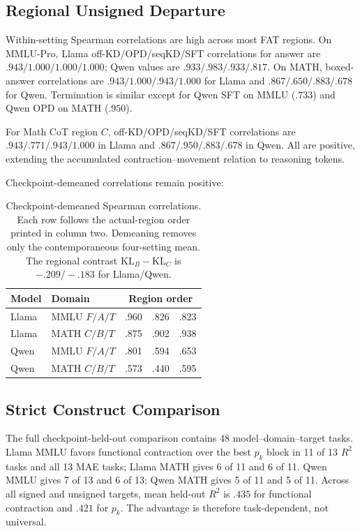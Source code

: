\documentclass[letterpaper]{article} %
\begin{document}
\subsection{Regional Unsigned Departure}

Within-setting Spearman correlations are high across most FAT regions. On MMLU-Pro,
Llama off-KD/OPD/seqKD/SFT correlations for answer are
$.943/1.000/1.000/1.000$; Qwen values are
$.933/.983/.933/.817$. On MATH, boxed-answer correlations are
$.943/1.000/.943/1.000$ for Llama and
$.867/.650/.883/.678$ for Qwen. Termination is similar except for Qwen SFT on MMLU
($.733$) and Qwen OPD on MATH ($.950$).

For Math CoT region $C$, off-KD/OPD/seqKD/SFT correlations are
$.943/.771/.943/1.000$ in Llama and $.867/.950/.883/.678$ in Qwen. All are
positive, extending the accumulated contraction--movement relation to reasoning tokens.

Checkpoint-demeaned correlations remain positive:
\begin{table}[t]
\centering
\small
\setlength{\tabcolsep}{3.5pt}
\begin{tabular}{llrrr}
\toprule
Model & Domain & \multicolumn{3}{c}{Region order} \\
\midrule
Llama & MMLU $F/A/T$ & .960 & .826 & .823 \\
Llama & MATH $C/B/T$ & .875 & .902 & .938 \\
Qwen & MMLU $F/A/T$ & .801 & .594 & .653 \\
Qwen & MATH $C/B/T$ & .573 & .440 & .595 \\
\bottomrule
\end{tabular}
\caption{Checkpoint-demeaned Spearman correlations. Each row follows the actual-region
order printed in column two. Demeaning removes only the contemporaneous four-setting
mean. The regional contrast $\mathrm{KL}_B-\mathrm{KL}_C$ is $-.209/-.183$ for
Llama/Qwen.}
\label{tab:supp-demean}
\end{table}

\subsection{Strict Construct Comparison}

The full checkpoint-held-out comparison contains 48 model--domain--target tasks. Llama
MMLU favors functional contraction over the best $p_k$ block in 11 of 13 $R^2$ tasks
and all 13 MAE tasks; Llama MATH gives 6 of 11 and 6 of 11. Qwen MMLU gives 7 of 13 and
6 of 13; Qwen MATH gives 5 of 11 and 5 of 11. Across all signed and unsigned targets,
mean held-out $R^2$ is $.435$ for functional contraction and $.421$ for $p_k$. The
advantage is therefore task-dependent, not universal.
\end{document}
